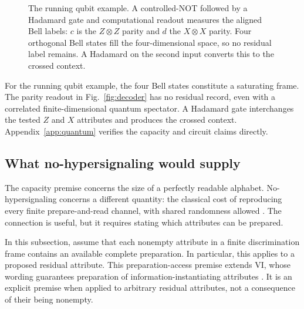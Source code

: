 \documentclass[a4paper,11pt,twocolumn,unpublished]{quantumarticle}
\let\label\QuantumKernelLabel
\begin{document}
\begin{figure}[!htbp]
\centering
{}
\caption{The running qubit example. A controlled-NOT followed by a Hadamard gate and computational readout measures the aligned Bell labels: $c$ is the $Z\otimes Z$ parity and $d$ the $X\otimes X$ parity. Four orthogonal Bell states fill the four-dimensional space, so no residual label remains. A Hadamard on the second input converts this to the crossed context.}
\label{fig:decoder}
\end{figure}

For the running qubit example, the four Bell states constitute a saturating frame. The parity readout in Fig.~\ref{fig:decoder} has no residual record, even with a correlated finite-dimensional quantum spectator. A Hadamard gate interchanges the tested $Z$ and $X$ attributes and produces the crossed context. Appendix~\ref{app:quantum} verifies the capacity and circuit claims directly.

\subsection{What no-hypersignaling would supply}
The capacity premise concerns the size of a perfectly readable alphabet. No-hypersignaling concerns a different quantity: the classical cost of reproducing every finite prepare-and-read channel, with shared randomness allowed \cite[Definitions 2--3, Eq.~(2)]{hs}. The connection is useful, but it requires stating which attributes can be prepared.

In this subsection, assume that each nonempty attribute in a finite discrimination frame contains an available complete preparation. In particular, this applies to a proposed residual attribute. This preparation-access premise extends VI, whose wording guarantees preparation of information-instantiating attributes \cite[Sec.~6, VI, p.~13]{cti}. It is an explicit premise when applied to arbitrary residual attributes, not a consequence of their being nonempty.
\end{document}
